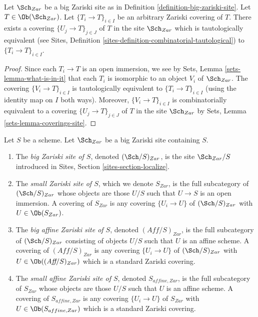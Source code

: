 \begin{lemma}
\label{lemma-zariski-induced}
Let $\Sch_{Zar}$ be a big Zariski site as in
Definition \ref{definition-big-zariski-site}.
Let $T \in \Ob(\Sch_{Zar})$.
Let $\{T_i \to T\}_{i \in I}$ be an arbitrary Zariski covering of $T$.
There exists a covering $\{U_j \to T\}_{j \in J}$ of $T$ in the site
$\Sch_{Zar}$ which is tautologically equivalent (see
Sites, Definition \ref{sites-definition-combinatorial-tautological})
to $\{T_i \to T\}_{i \in I}$.
\end{lemma}

\begin{proof}
Since each $T_i \to T$ is an open immersion, we see by
Sets, Lemma \ref{sets-lemma-what-is-in-it}
that each $T_i$ is isomorphic to an object $V_i$ of $\Sch_{Zar}$.
The covering $\{V_i \to T\}_{i \in I}$ is tautologically equivalent
to $\{T_i \to T\}_{i \in I}$ (using the identity map on $I$ both ways).
Moreover, $\{V_i \to T\}_{i \in I}$ is combinatorially equivalent to a
covering $\{U_j \to T\}_{j \in J}$ of $T$ in the site $\Sch_{Zar}$ by
Sets, Lemma \ref{sets-lemma-coverings-site}.
\end{proof}

\begin{definition}
\label{definition-big-small-Zariski}
Let $S$ be a scheme. Let $\Sch_{Zar}$ be a big Zariski
site containing $S$.
\begin{enumerate}
\item The {\it big Zariski site of $S$}, denoted
$(\Sch/S)_{Zar}$, is the site $\Sch_{Zar}/S$
introduced in Sites, Section \ref{sites-section-localize}.
\item The {\it small Zariski site of $S$}, which we denote
$S_{Zar}$, is the full subcategory of $(\Sch/S)_{Zar}$
whose objects are those $U/S$ such that $U \to S$ is an open immersion.
A covering of $S_{Zar}$ is any covering $\{U_i \to U\}$ of
$(\Sch/S)_{Zar}$ with $U \in \Ob(S_{Zar})$.
\item The {\it big affine Zariski site of $S$}, denoted
$(\textit{Aff}/S)_{Zar}$, is the full subcategory of
$(\Sch/S)_{Zar}$ consisting of objects $U/S$ such that $U$ is an
affine scheme. A covering of $(\textit{Aff}/S)_{Zar}$ is any covering
$\{U_i \to U\}$ of $(\Sch/S)_{Zar}$ with $U \in \Ob((\textit{Aff}/S)_{Zar})$
which is a standard Zariski covering.
\item The {\it small affine Zariski site of $S$}, denoted
$S_{affine, Zar}$, is the full subcategory of $S_{Zar}$
whose objects are those $U/S$ such that $U$ is an affine scheme.
A covering of $S_{affine, Zar}$ is any covering $\{U_i \to U\}$ of
$S_{Zar}$ with $U \in \Ob(S_{affine, Zar})$
which is a standard Zariski covering.
\end{enumerate}
\end{definition}

